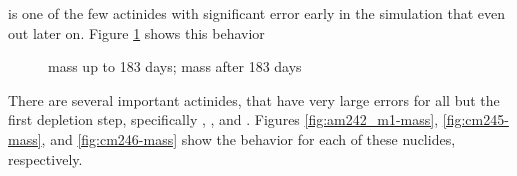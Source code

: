 
 is one of the few actinides with significant error early in the
simulation that even out later on. Figure \ref{fig:cm242-mass} shows this
behavior

\begin{figure}[htpb]
    \centering
    \caption{}
    \caption[ mass]{
      mass up to 183 days;
      mass after 183 days}
    \label{fig:cm242-mass}
\end{figure}

There are several important actinides, that
have very large errors for all but the first depletion step, specifically
, , and  . Figures
\ref{fig:am242_m1-mass}, \ref{fig:cm245-mass}, and \ref{fig:cm246-mass} show
the behavior for each of these nuclides, respectively.

